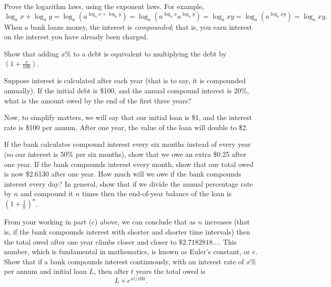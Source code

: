 \begin{questions}
  \question Prove the logarithm laws, using the exponent laws. For example,
            \begin{displaymath}
              \log_a x + \log_a y = \log_a (a^{\log_a x + \log_a y}) = \log_a (a^{\log_a x}a^{\log_a y}) = \log_a xy = \log_ a (a^{\log_a xy}) = \log_a xy.
            \end{displaymath}
  \question When a bank loans money, the interest is \emph{compounded}; that is, you earn interest on the interest you have already
            been charged.
    \begin{parts}
      \item Show that adding $ x\% $ to a debt is equivalent to multiplying the debt by $ (1 + \frac{x}{100}) $.
      \item Suppose interest is calculated after each year (that is to say, it is compounded annually). If the initial
            debt is \$100, and the annual compound interest is 20\%, what is the amount owed by the end of the first three years?
      \item Now, to simplify matters, we will say that our initial loan is \$1, and the interest rate is \$100 per annum. After
            one year, the value of the loan will double to \$2.
        \begin{subparts}
          \subpart If the bank calculates compound interest every six months instead of every year (so our interest is 50\% per
                   six months), show that we owe an extra \$0.25 after one year.
          \subpart If the bank compounds interest every month, show that our total owed is now \$2.6130 after one year.
          \subpart How much will we owe if the bank compounds interest every day?
          \subpart In general, show that if we divide the annual percentage rate by $ n $ and compound it $ n $ times then the end-of-year
                   balance of the loan is $ (1 + \frac{1}{n})^n $.
        \end{subparts}
      \item From your working in part (c) above, we can conclude that as $ n $ increases (that is, if the bank compounds interest with shorter
            and shorter time intervals) then the total owed after one year climbs closer and closer to $ \$2.7182818... $. This number, which
            is fundamental in mathematics, is known as Euler's constant, or $ e $. Show that if a bank compounds interest continuously, with an
            interest rate of $ x\% $ per annum and initial loan $ L $, then after $ t $ years the total owed is
            \begin{displaymath}
              L \times e^{xt/100}.
            \end{displaymath}


\end{parts}
\end{questions}
